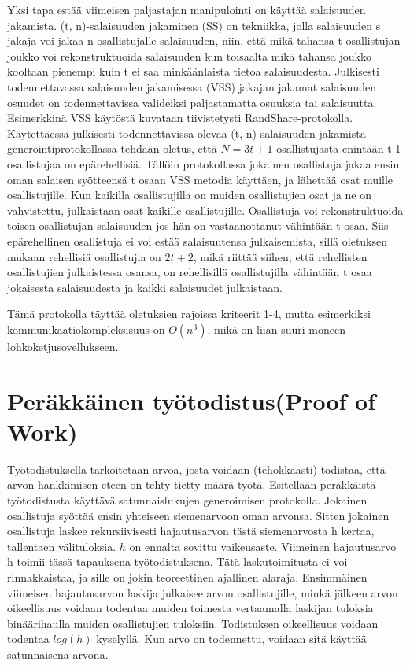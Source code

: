 Yksi tapa estää viimeisen paljastajan manipulointi on käyttää salaisuuden jakamista. (t, n)-salaisuuden jakaminen (SS) on tekniikka, jolla salaisuuden s jakaja voi jakaa n osallistujalle salaisuuden, niin, että mikä tahansa t osallistujan joukko voi rekonstruktuoida salaisuuden kun toisaalta mikä tahansa joukko kooltaan pienempi kuin t ei saa minkäänlaista tietoa salaisuudesta\cite{syta_scalable_2017}. Julkisesti todennettavassa salaisuuden jakamisessa (VSS) jakajan jakamat salaisuuden osuudet on todennettavissa valideiksi paljastamatta osuuksia tai salaisuutta. Esimerkkinä VSS käytöstä kuvataan tiivistetysti RandShare-protokolla\cite{syta_scalable_2017}. Käytettäessä julkisesti todennettavissa olevaa (t, n)-salaisuuden jakamista generointiprotokollassa tehdään oletus, että $N = 3t+1$ osallistujasta enintään t-1 osallistujaa on epärehellisiä. Tällöin protokollassa jokainen osallistuja jakaa ensin oman salaisen syötteensä t osaan VSS metodia käyttäen, ja lähettää osat muille osallistujille. Kun kaikilla osallistujilla on muiden osallistujien osat ja ne on vahvistettu, julkaistaan osat kaikille osallistujille. Osallistuja voi rekonstruktuoida toisen osallistujan salaisuuden jos hän on vastaanottanut vähintään t osaa. Siis epärehellinen osallistuja ei voi estää salaisuutensa julkaisemista, sillä oletuksen mukaan rehellisiä osallistujia on $2t+2$, mikä riittää siihen, että rehellisten osallistujien julkaistessa osansa, on rehellisillä osallistujilla vähintään t osaa jokaisesta salaisuudesta ja kaikki salaisuudet julkaistaan. 

Tämä protokolla täyttää oletuksien rajoissa kriteerit 1-4, mutta esimerkiksi kommunikaatiokompleksisuus on $O(n^3)$\cite{syta_scalable_2017}, mikä on liian suuri moneen lohkoketjusovellukseen.

\section{Peräkkäinen työtodistus(Proof of Work)}
Työtodistuksella tarkoitetaan arvoa, josta voidaan (tehokkaasti) todistaa, että arvon hankkimisen eteen on tehty tietty määrä työtä. Esitellään peräkkäistä työtodistusta käyttävä satunnaislukujen generoimisen protokolla\cite{lesaege_kleros_2020}. Jokainen osallistuja syöttää ensin yhteiseen siemenarvoon oman arvonsa. Sitten jokainen osallistuja laskee rekursiivisesti hajautusarvon tästä siemenarvosta h kertaa, tallentaen välituloksia. $h$ on ennalta sovittu vaikeusaste. Viimeinen hajautusarvo h toimii tässä tapauksena työtodistuksena. Tätä laskutoimitusta ei voi rinnakkaistaa, ja sille on jokin teoreettinen ajallinen alaraja. Ensimmäinen viimeisen hajautusarvon laskija julkaisee arvon osallistujille, minkä jälkeen arvon oikeellisuus voidaan todentaa muiden toimesta vertaamalla laskijan tuloksia binäärihaulla muiden osallistujien tuloksiin. Todistuksen oikeellisuus voidaan todentaa $log(h)$ kyselyllä. Kun arvo on todennettu, voidaan sitä käyttää satunnaisena arvona.

